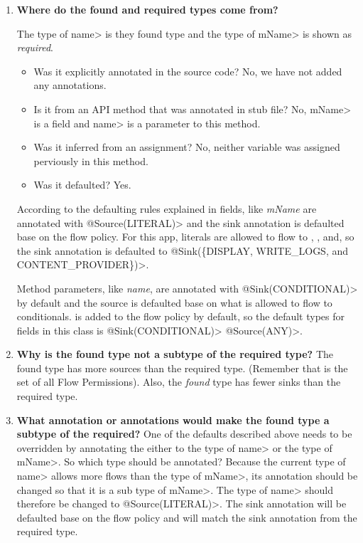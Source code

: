 \begin{enumerate}

\item \textbf{Where do the found  and required types come from?}

The type of \<name> is they found type and the type of \<mName> is
shown as \emph{required}.  

 \begin{itemize}
    \item Was it explicitly annotated in the source code? No, we have not added 
    any annotations.
    \item Is it from an API method that was annotated in stub file? No, \<mName> 
    is a field and \<name> is a parameter to this method.
    \item Was it inferred from an assignment? No, neither variable was assigned 
    perviously in this method. 
    \item Was it defaulted? Yes.
    \end{itemize}

 According to the defaulting rules explained in  fields, like \emph{mName} 
 are annotated with \<@Source(LITERAL)> and the sink annotation is defaulted base on the  
 flow policy.  For this app, literals are allowed to flow to , 
 , and, so the sink annotation is 
 defaulted to \<@Sink(\{DISPLAY, WRITE\_LOGS, and CONTENT\_PROVIDER\})>.
 
 Method parameters, like \emph{name}, are annotated with \<@Sink(CONDITIONAL)> by 
 default and the source is defaulted base on what is allowed to flow to conditionals.
    is added to the flow policy by default, so the default types
    for fields in this class is \<@Sink(CONDITIONAL)> \<@Source(ANY)>.

 
 \item\textbf{ Why is the found type not a subtype of the required type?}
The found type has more sources than the required type. (Remember that 
is the set of all Flow Permissions). Also, the \emph{found} type has fewer sinks 
than the required type.

\item\textbf{What annotation or annotations would make the found type a subtype of the required?}
One of the defaults described above needs to be overridden by annotating the 
 either to the type of \<name> or the type of \<mName>. So which type should be 
 annotated? Because the current type of \<name> allows more flows than the type
 of \<mName>, its annotation should be changed so that it is a sub type of \<mName>.
  The type of \<name> should therefore be changed to \<@Source(LITERAL)>. The 
  sink annotation will be defaulted base on the flow policy and will match the 
  sink annotation from the required type.


\end{enumerate}
